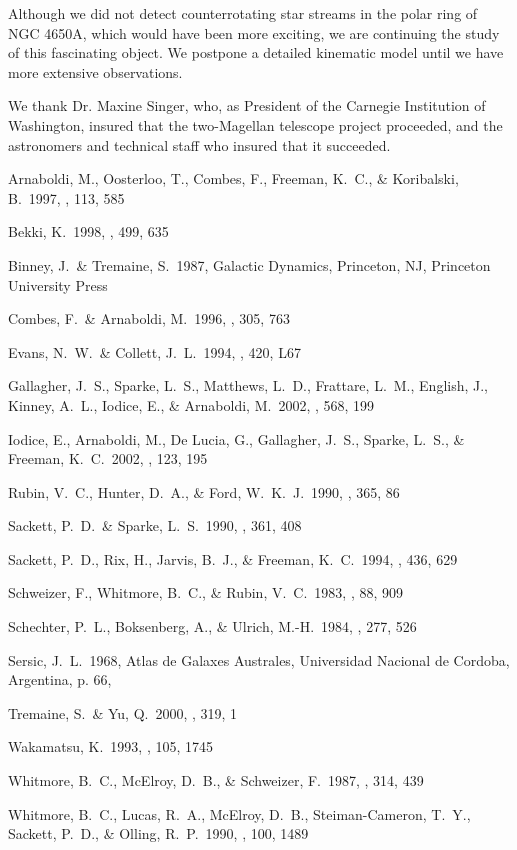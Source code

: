 \documentclass[manuscript]{aastex}
\begin{document}
Although we did not detect counterrotating star streams in the polar
ring of NGC 4650A, which would have been more exciting, we are
continuing the study of this fascinating object. We postpone a
detailed kinematic model until we have more extensive observations.

\acknowledgements

We thank Dr. Maxine Singer, who, as President of the Carnegie
Institution of Washington, insured that the two-Magellan telescope
project proceeded, and the astronomers and technical staff who 
insured that it succeeded.

\begin{references}

 Arnaboldi, M., Oosterloo, T., Combes, F., Freeman, K.~C.,
\& Koribalski, B.\ 1997, \aj, 113, 585

 Bekki, K.\ 1998, \apj, 499, 635 

 Binney, J.~\& Tremaine, S.\ 1987, Galactic Dynamics,
Princeton, NJ, Princeton University Press

 Combes, F.~\& Arnaboldi, M.\ 1996, \aap, 305, 763

 Evans, N.~W.~\& Collett, J.~L.\ 1994, \apjl, 420, L67

 Gallagher, J.~S., Sparke, L.~S., Matthews, L.~D.,
Frattare, L.~M., English, J., Kinney, A.~L., Iodice, E., \& Arnaboldi,
M.\ 2002, \apj, 568, 199

 Iodice, E., Arnaboldi, M., De Lucia, G., Gallagher,
J.~S., Sparke, L.~S., \& Freeman, K.~C.\ 2002, \aj, 123, 195

 Rubin, V.~C., Hunter, D.~A., \& Ford, W.~K.~J.\ 1990,
\apj, 365, 86

 Sackett, P.~D.~\& Sparke, L.~S.\ 1990, \apj, 361, 408

 Sackett, P.~D., Rix, H., Jarvis, B.~J., \& Freeman,
K.~C.\ 1994, \apj, 436, 629

 Schweizer, F., Whitmore, B.~C., \& Rubin, V.~C.\ 1983,
\aj, 88, 909

 Schechter, P.~L., Boksenberg, A., \& Ulrich, M.-H.\ 1984,
\apj, 277, 526

 Sersic, J.~L.\ 1968, Atlas de Galaxes Australes,
Universidad Nacional de Cordoba, Argentina, p. 66,

 Tremaine, S.~\& Yu, Q.\ 2000, \mnras, 319, 1

 Wakamatsu, K.\ 1993, \aj, 105, 1745

 Whitmore, B.~C., McElroy, D.~B., \& Schweizer, F.\ 1987,
\apj, 314, 439

 Whitmore, B.~C., Lucas, R.~A., McElroy, D.~B.,
Steiman-Cameron, T.~Y., Sackett, P.~D., \& Olling, R.~P.\ 1990, \aj,
100, 1489

\end{references}
\end{document}
